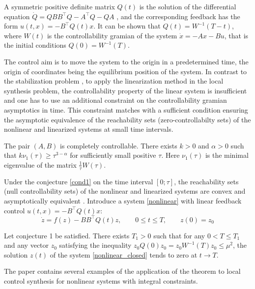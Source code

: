 \documentclass[12pt]{llncs}
\begin{document}
 A symmetric positive definite matrix $Q(t)$ is the solution of the differential equation $\dot{Q} = Q B B^{\top} Q - A^{\top}Q - Q A$ ,
and the corresponding feedback has the form $ u(t,x) = -B^{\top} Q(t) x$.  It can be shown that $Q(t)=W^{-1}(T-t)$, where $W(t)$ is  the controllability gramian of the system $\dot{x} = -A x - B u $, that is the initial conditions $ Q(0)=W^{-1}(T)$.

The control aim is to move the system to the origin in a predetermined time, the origin of coordinates being the equilibrium position of the system. In contrast to the stabilization problem \cite{halil}, to apply the linearization method in the local synthesis problem, the controllability property of the linear system is insufficient and one has to use an additional constraint on the controllability gramian asymptotics in time. This constraint matches with a sufficient condition ensuring the asymptotic equivalence of the reachability sets (zero-controllabilty sets) of the nonlinear and linearized systems at small time intervals.

\begin{conjecture}\label{cond1}
	 The pair $(A,B)$ is completely controllable. There exists $ k > 0$ and $\alpha > 0$ such that $ k \nu_1(\tau) \geq \tau^{3-\alpha}  $
	for sufficiently small positive $\tau$. Here $ \nu_1(\tau) $ is  the minimal eigenvalue of the matrix $ \frac{1}{\tau} W(\tau) $.
\end{conjecture}

Under the conjecture \ref{cond1} on the time interval $ [0; \tau] $, the reachability sets (null controllability sets) of the nonlinear and linearized systems are convex \cite{Gus1} and asymptotically equivalent \cite{GusOsipov,Osipov}. Introduce a system \eqref{nonlinear} with linear feedback control $ u(t,x) = -B^{\top} Q(t) x$:
\begin{equation}\label{nonlinear_closed}
	\dot{z} = f(z) - B B^{\top} Q(t) z, \qquad 0 \leq t \leq T, \qquad z(0) = z_0
\end{equation}
\begin{theorem}
	 Let conjecture 1 be satisfied. There exists $T_1>0$ such that for any $0<T \leq T_1$ and any vector $z_0$ satisfying the inequality $z_0 Q(0)z_0=z_0 W^{-1}(T)z_0\leq \mu^2$, the solution $z(t)$ of the system \eqref{nonlinear_closed} tends to zero at $t \to T$. 
\end{theorem}

The paper contains several examples of the application of the theorem to local control synthesis for nonlinear systems with integral constraints.
\end{document}
